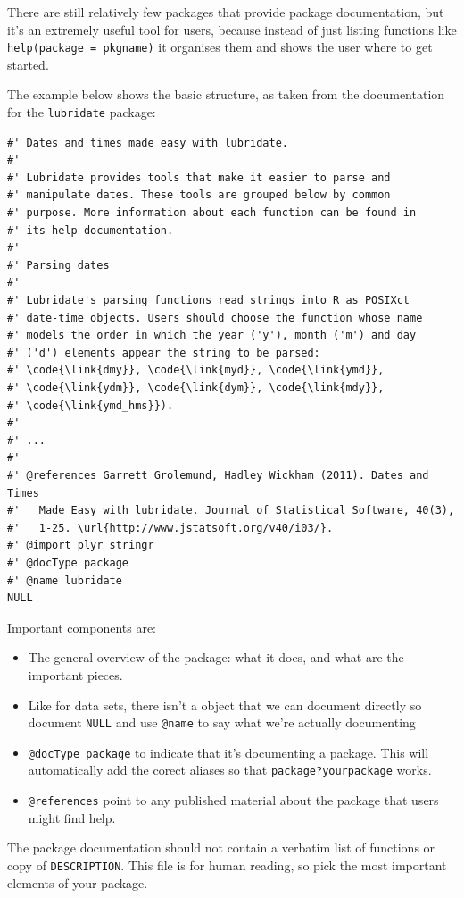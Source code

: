 There are still relatively few packages that provide package
documentation, but it's an extremely useful tool for users, because
instead of just listing functions like \texttt{help(package = pkgname)}
it organises them and shows the user where to get started.

The example below shows the basic structure, as taken from the
documentation for the \texttt{lubridate} package:

\begin{verbatim}
#' Dates and times made easy with lubridate.
#'
#' Lubridate provides tools that make it easier to parse and 
#' manipulate dates. These tools are grouped below by common 
#' purpose. More information about each function can be found in 
#' its help documentation.
#'
#' Parsing dates
#'
#' Lubridate's parsing functions read strings into R as POSIXct 
#' date-time objects. Users should choose the function whose name 
#' models the order in which the year ('y'), month ('m') and day 
#' ('d') elements appear the string to be parsed: 
#' \code{\link{dmy}}, \code{\link{myd}}, \code{\link{ymd}}, 
#' \code{\link{ydm}}, \code{\link{dym}}, \code{\link{mdy}}, 
#' \code{\link{ymd_hms}}). 
#' 
#' ...
#' 
#' @references Garrett Grolemund, Hadley Wickham (2011). Dates and Times
#'   Made Easy with lubridate. Journal of Statistical Software, 40(3),
#'   1-25. \url{http://www.jstatsoft.org/v40/i03/}.
#' @import plyr stringr
#' @docType package
#' @name lubridate
NULL
\end{verbatim}

Important components are:

\begin{itemize}
\item
  The general overview of the package: what it does, and what are the
  important pieces.
\item
  Like for data sets, there isn't a object that we can document directly
  so document \texttt{NULL} and use \texttt{@name} to say what we're
  actually documenting
\item
  \texttt{@docType package} to indicate that it's documenting a package.
  This will automatically add the corect aliases so that
  \texttt{package?yourpackage} works.
\item
  \texttt{@references} point to any published material about the package
  that users might find help.
\end{itemize}

The package documentation should not contain a verbatim list of
functions or copy of \texttt{DESCRIPTION}. This file is for human
reading, so pick the most important elements of your package.

